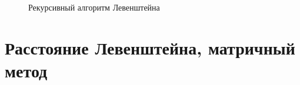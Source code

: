 \documentclass[12pt,a4paper]{report}
\begin{document}
\begin{figure}[ht]
	\caption{Рекурсивный алгоритм Левенштейна}
\end{figure}

\newpage
\section*{Расстояние Левенштейна, матричный метод} \
\end{document}
